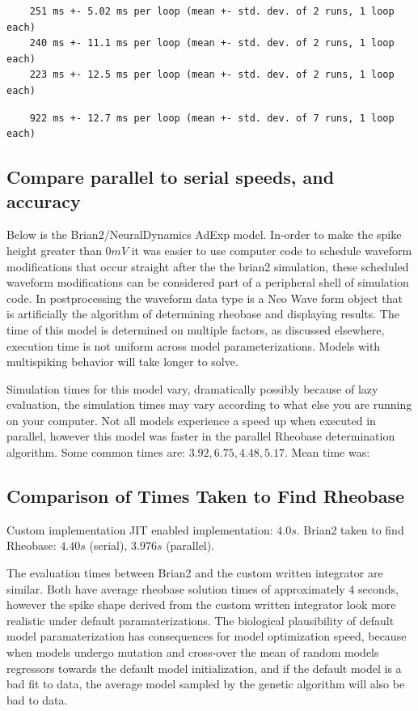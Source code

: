 \begin{verbatim}
    251 ms +- 5.02 ms per loop (mean +- std. dev. of 2 runs, 1 loop each)
    240 ms +- 11.1 ms per loop (mean +- std. dev. of 2 runs, 1 loop each)
    223 ms +- 12.5 ms per loop (mean +- std. dev. of 2 runs, 1 loop each)
\end{verbatim}

\begin{verbatim}
    922 ms +- 12.7 ms per loop (mean +- std. dev. of 7 runs, 1 loop each)
\end{verbatim}

\subsection{Compare parallel to serial speeds, and accuracy}

Below is the Brian2/NeuralDynamics AdExp model. In-order to make the spike height greater than $0mV$ it was easier to use computer code to schedule waveform modifications that occur straight after the the brian2 simulation, these scheduled waveform modifications can be considered part of a peripheral shell of simulation code. In postprocessing
the waveform data type is a Neo Wave form object that is artificially the algorithm of determining rheobase and displaying results. The time of this model is determined on multiple factors, as discussed elsewhere, execution time is not uniform across model parameterizations. Models with multispiking behavior will take longer to solve.

Simulation times for this model vary, dramatically possibly because of
lazy evaluation, the simulation times may vary according to what else
you are running on your computer. Not all models experience a speed up when executed in parallel, however
this model was faster in the parallel Rheobase determination algorithm. Some common times are: $3.92,6.75,4.48,5.17$. Mean time was:

\subsection{Comparison of Times Taken to Find Rheobase}
Custom implementation JIT enabled implementation: $4.0s$. 
Brian2 taken to find Rheobase: $4.40s$ (serial), $3.976s$ (parallel).

The evaluation times between Brian2 and the custom written
integrator are similar. Both have average rheobase solution times of approximately 4 seconds, however the spike shape derived from the custom written integrator look more realistic under default paramaterizations. The biological plausibility of default model paramaterization has consequences for model optimization speed, because when  models undergo mutation and cross-over the mean of random models regressors towards the default model initialization, and if the default model is a bad fit to data, the average model sampled by the genetic algorithm will also be bad to data.\\


